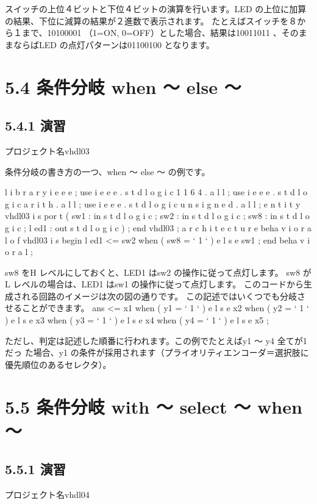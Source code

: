\documentclass[letterpaper,10pt,dvipdfmx]{sphinxmanual}
\begin{document}
スイッチの上位４ビットと下位４ビットの演算を行います。LED の上位に加算の結果、下位に減算の結果が２進数で表示されます。
たとえばスイッチを８から１まで、10100001 （1=ON, 0=OFF）とした場合、結果は10011011 、そのままならばLED の点灯パターンは01100100 となります。


\section{5.4 条件分岐 when ～ else ～}
\label{05_try:when-else}

\subsection{5.4.1 演習}
\label{05_try:id7}
プロジェクト名vhdl03

条件分岐の書き方の一つ、when ～ else ～ の例です。

l i b r a r y i e e e ;
use i e e e . s t d l o g i c 1 1 6 4 . a l l ;
use i e e e . s t d l o g i c a r i t h . a l l ;
use i e e e . s t d l o g i c u n s i g n e d . a l l ;
e n t i t y vhdl03 i s
por t (
sw1 : in s t d l o g i c ;
sw2 : in s t d l o g i c ;
sw8 : in s t d l o g i c ;
l ed1 : out s t d l o g i c
) ;
end vhdl03 ;
a r c h i t e c t u r e beha v i o r a l o f vhdl03 i s
begin
l ed1 \textless{}= sw2 when ( sw8 = ` 1 ` )
e l s e sw1 ;
end beha v i o r a l ;

sw8 をH レベルにしておくと、LED1 はsw2 の操作に従って点灯します。
sw8 がL レベルの場合は、LED1 はsw1 の操作に従って点灯します。
このコードから生成される回路のイメージは次の図の通りです。
この記述ではいくつでも分岐させることができます。
ans \textless{}= x1 when ( y1 = ` 1 ` )
e l s e x2 when ( y2 = ` 1 ` )
e l s e x3 when ( y3 = ` 1 ` )
e l s e x4 when ( y4 = ` 1 ` )
e l s e x5 ;

ただし、判定は記述した順番に行われます。この例でたとえばy1 ～ y4 全てが1 だっ
た場合、y1 の条件が採用されます（プライオリティエンコーダ＝選択肢に優先順位のあるセレクタ）。


\section{5.5 条件分岐 with ～ select ～ when ～}
\label{05_try:with-select-when}

\subsection{5.5.1 演習}
\label{05_try:id8}
プロジェクト名vhdl04
\end{document}
